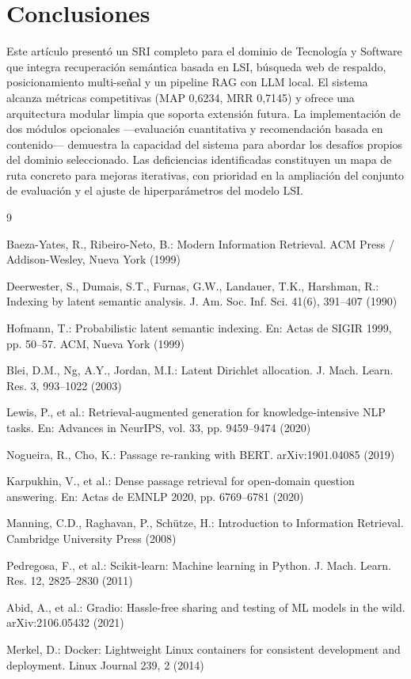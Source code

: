 \documentclass[runningheads,a4paper]{llncs}
\begin{document}
\section{Conclusiones}

Este artículo presentó un SRI completo para el dominio de Tecnología y Software que integra recuperación semántica basada en LSI, búsqueda web de respaldo, posicionamiento multi-señal y un pipeline RAG con LLM local. El sistema alcanza métricas competitivas (MAP 0,6234, MRR 0,7145) y ofrece una arquitectura modular limpia que soporta extensión futura. La implementación de dos módulos opcionales —evaluación cuantitativa y recomendación basada en contenido— demuestra la capacidad del sistema para abordar los desafíos propios del dominio seleccionado. Las deficiencias identificadas constituyen un mapa de ruta concreto para mejoras iterativas, con prioridad en la ampliación del conjunto de evaluación y el ajuste de hiperparámetros del modelo LSI.

\begin{thebibliography}{9}

Baeza-Yates, R., Ribeiro-Neto, B.:
Modern Information Retrieval.
ACM Press / Addison-Wesley, Nueva York (1999)

Deerwester, S., Dumais, S.T., Furnas, G.W., Landauer, T.K., Harshman, R.:
Indexing by latent semantic analysis.
J. Am. Soc. Inf. Sci. 41(6), 391--407 (1990)

Hofmann, T.:
Probabilistic latent semantic indexing.
En: Actas de SIGIR 1999, pp. 50--57. ACM, Nueva York (1999)

Blei, D.M., Ng, A.Y., Jordan, M.I.:
Latent Dirichlet allocation.
J. Mach. Learn. Res. 3, 993--1022 (2003)

Lewis, P., et al.:
Retrieval-augmented generation for knowledge-intensive NLP tasks.
En: Advances in NeurIPS, vol. 33, pp. 9459--9474 (2020)

Nogueira, R., Cho, K.:
Passage re-ranking with BERT.
arXiv:1901.04085 (2019)

Karpukhin, V., et al.:
Dense passage retrieval for open-domain question answering.
En: Actas de EMNLP 2020, pp. 6769--6781 (2020)

Manning, C.D., Raghavan, P., Schütze, H.:
Introduction to Information Retrieval.
Cambridge University Press (2008)

Pedregosa, F., et al.:
Scikit-learn: Machine learning in Python.
J. Mach. Learn. Res. 12, 2825--2830 (2011)

Abid, A., et al.:
Gradio: Hassle-free sharing and testing of ML models in the wild.
arXiv:2106.05432 (2021)


Merkel, D.:
Docker: Lightweight Linux containers for consistent development and deployment.
Linux Journal 239, 2 (2014)

\end{thebibliography}
\end{document}
